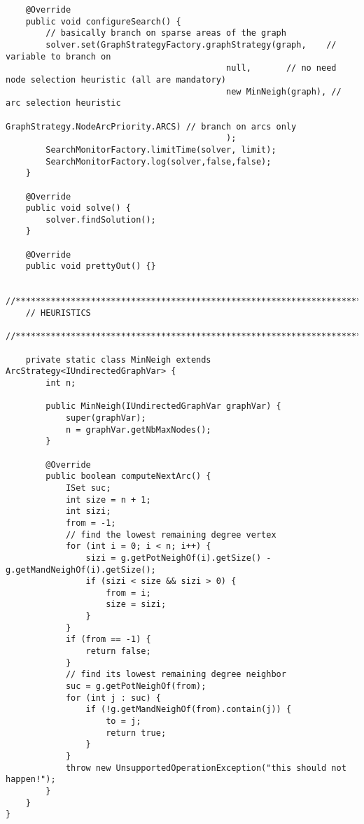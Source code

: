 \documentclass{article}
\begin{document}
\begin{lstlisting}
	@Override
	public void configureSearch() {
		// basically branch on sparse areas of the graph
		solver.set(GraphStrategyFactory.graphStrategy(graph, 	// variable to branch on
											null, 		// no need node selection heuristic (all are mandatory)
											new MinNeigh(graph), // arc selection heuristic
											GraphStrategy.NodeArcPriority.ARCS) // branch on arcs only
											);
		SearchMonitorFactory.limitTime(solver, limit);
		SearchMonitorFactory.log(solver,false,false);
	}

	@Override
	public void solve() {
		solver.findSolution();
	}

	@Override
	public void prettyOut() {}

	//***********************************************************************************
	// HEURISTICS
	//***********************************************************************************

	private static class MinNeigh extends ArcStrategy<IUndirectedGraphVar> {
		int n;

		public MinNeigh(IUndirectedGraphVar graphVar) {
			super(graphVar);
			n = graphVar.getNbMaxNodes();
		}

		@Override
		public boolean computeNextArc() {
			ISet suc;
			int size = n + 1;
			int sizi;
			from = -1;
			// find the lowest remaining degree vertex
			for (int i = 0; i < n; i++) {
				sizi = g.getPotNeighOf(i).getSize() - g.getMandNeighOf(i).getSize();
				if (sizi < size && sizi > 0) {
					from = i;
					size = sizi;
				}
			}
			if (from == -1) {
				return false;
			}
			// find its lowest remaining degree neighbor
			suc = g.getPotNeighOf(from);
			for (int j : suc) {
				if (!g.getMandNeighOf(from).contain(j)) {
					to = j;
					return true;
				}
			}
			throw new UnsupportedOperationException("this should not happen!");
		}
	}
}
\end{lstlisting}
\end{document}
